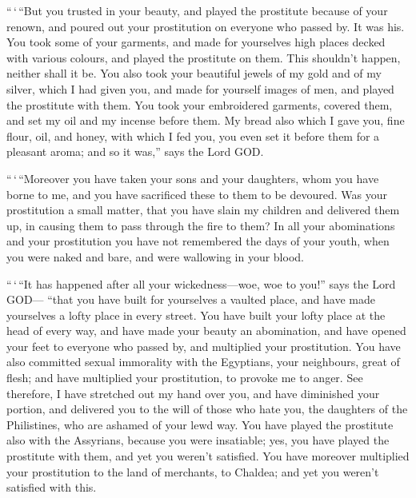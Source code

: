  ``\,`\,``But you trusted in your beauty, and played the
prostitute because of your renown, and poured out your prostitution on
everyone who passed by. It was his.  You took some of
your garments, and made for yourselves high places decked with various
colours, and played the prostitute on them. This shouldn't happen,
neither shall it be.  You also took your beautiful jewels
of my gold and of my silver, which I had given you, and made for
yourself images of men, and played the prostitute with them.
 You took your embroidered garments, covered them, and
set my oil and my incense before them.  My bread also
which I gave you, fine flour, oil, and honey, with which I fed you, you
even set it before them for a pleasant aroma; and so it was,'' says the
Lord GOD.

 ``\,`\,``Moreover you have taken your sons and your
daughters, whom you have borne to me, and you have sacrificed these to
them to be devoured. Was your prostitution a small matter,
 that you have slain my children and delivered them up,
in causing them to pass through the fire to them?  In all
your abominations and your prostitution you have not remembered the days
of your youth, when you were naked and bare, and were wallowing in your
blood.

 ``\,`\,``It has happened after all your
wickedness---woe, woe to you!'' says the Lord GOD--- 
``that you have built for yourselves a vaulted place, and have made
yourselves a lofty place in every street.  You have built
your lofty place at the head of every way, and have made your beauty an
abomination, and have opened your feet to everyone who passed by, and
multiplied your prostitution.  You have also committed
sexual immorality with the Egyptians, your neighbours, great of flesh;
and have multiplied your prostitution, to provoke me to anger.
 See therefore, I have stretched out my hand over you,
and have diminished your portion, and delivered you to the will of those
who hate you, the daughters of the Philistines, who are ashamed of your
lewd way.  You have played the prostitute also with the
Assyrians, because you were insatiable; yes, you have played the
prostitute with them, and yet you weren't satisfied.  You
have moreover multiplied your prostitution to the land of merchants, to
Chaldea; and yet you weren't satisfied with this.

